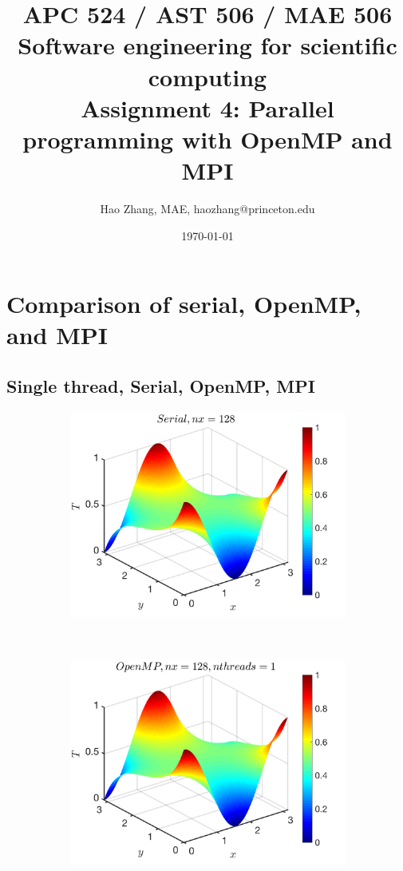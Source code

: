 \documentclass[a4paper]{article}
\title{APC 524 / AST 506 / MAE 506 Software engineering for scientific computing
\\Assignment 4: Parallel programming with OpenMP and MPI}
\author{Hao Zhang, MAE, haozhang@princeton.edu}
\date{\today}
\begin{document}
\maketitle

\section{Comparison of serial, OpenMP, and MPI}
\subsection{Single thread, Serial, OpenMP, MPI}
      \begin{figure}[H]
        \centering
        \begin{subfigure}[b]{0.32\textwidth}   
            \centering 
            \includegraphics[width=\textwidth]{./Figure/heat_serial_nx128.png} 
        \end{subfigure}
        \
        \begin{subfigure}[b]{0.32\textwidth}   
            \centering 
            \includegraphics[width=\textwidth]{./Figure/heat_omp_nx128_nth1.png}  

\end{subfigure}
\end{figure}
\end{document}
